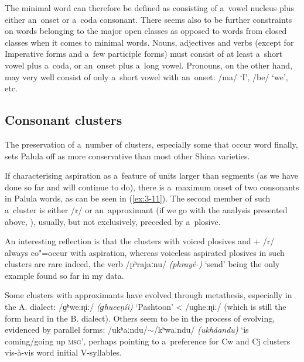 The minimal word can therefore be defined as consisting of a~vowel nucleus plus either an~onset or a~coda consonant. There seems also to be further constraints on words belonging to the major open classes as opposed to words from closed classes when it comes to minimal words. Nouns, adjectives and verbs (except for Imperative forms and a~few participle forms) must consist of at least a~short vowel plus a~coda, or an~onset plus a~long vowel. Pronouns, on the other hand, may very well consist of only a~short vowel with an~onset: /ma/ `I', /be/ `we', etc.


\subsection{Consonant clusters}
\label{subsec:3-3-2}


The preservation of a~number of clusters, especially some that occur word finally, sets Palula off as more conservative than most other Shina varieties. 


If characterising aspiration as a~feature of units larger than segments (as we have done so far and will continue to do), there is a~maximum onset of two consonants in Palula words, as can be seen in (\ref{ex:3-11}). The second member of such a~cluster is either /r/ or an~approximant (if we go with the analysis presented above, ), usually, but not exclusively, preceded by a~plosive. 


An interesting reflection is that the clusters with voiced plosives and + /r/ always co"=occur with aspiration, whereas voiceless aspirated plosives in such clusters are rare indeed, the verb /pʰrajaːnu/ \textit{(phrayé-)} `send' being the only example found so far in my data. 


Some clusters with approximants have evolved through metathesis, especially in the A. dialect: /ɡʰweːɳiː/ \textit{(ɡhueeṇíi)} `Pashtoon' {\textless} /uɡheːɳiː/ (which is still the form heard in the B. dialect). Others seem to be in the process of evolving, evidenced by parallel forms: /ukʰaːndu/$\sim$/kʰwaːndu/ \textit{(ukháandu)} `is coming/going up \textsc{msg}', perhaps pointing to a~preference for Cw and Cj clusters vis-à-vis word initial V-syllables.


